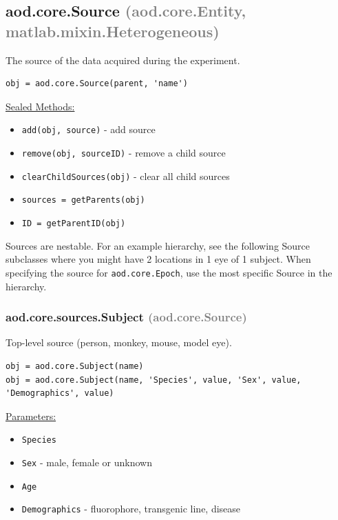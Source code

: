 \documentclass[10pt]{exam}
\newcommand\myparent[1]{\textcolor{gray}{(#1)}}
\newcommand\aodparam[1]{\textcolor{codepurple}{\texttt{#1}}}
\newcommand\aodclass[1]{\textcolor{codeblue}{\texttt{#1}}}
\newcommand\aodfcn[1]{\textcolor{darkteal}{\texttt{#1}}}
\newcommand\docheader[1]{\vspace{0.6ex}\noindent\underline{#1}\vspace{0.15ex}}
\begin{document}
	\subsection{aod.core.Source \myparent{aod.core.Entity, matlab.mixin.Heterogeneous}}
		\label{subsection:aod.core.Source}
		\noindent The source of the data acquired during the experiment. 
		\begin{lstlisting}[style=matlab-editor, basicstyle=\mlttfamily\footnotesize]
obj = aod.core.Source(parent, 'name')
		\end{lstlisting}
		\docheader{Sealed Methods:}
		\begin{itemize}
			\item \aodfcn{add(obj, source)} - add source 
			\item \aodfcn{remove(obj, sourceID)} - remove a child source
			\item \aodfcn{clearChildSources(obj)} - clear all child sources
			\item \aodfcn{sources = getParents(obj)}
			\item \aodfcn{ID = getParentID(obj)}
		\end{itemize}

		\noindent Sources are nestable. For an example hierarchy, see the following Source subclasses where you might have 2 locations in 1 eye of 1 subject. 
		When specifying the source for \aodclass{aod.core.Epoch}, use the most specific Source in the hierarchy.
		\subsubsection{aod.core.sources.Subject \textcolor{gray}{(aod.core.Source)}}
			\noindent Top-level source (person, monkey, mouse, model eye).
			\begin{lstlisting}[style=matlab-editor, basicstyle=\mlttfamily\footnotesize]
obj = aod.core.Subject(name)
obj = aod.core.Subject(name, 'Species', value, 'Sex', value, 'Demographics', value)
			\end{lstlisting}
			\docheader{Parameters:}
			\begin{itemize}
				\item \aodparam{Species}
				\item \aodparam{Sex} - male, female or unknown
				\item \aodparam{Age}
				\item \aodparam{Demographics} - fluorophore, transgenic line, disease
			\end{itemize}
\end{document}
